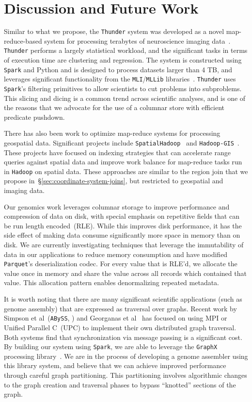 \documentclass{acm_proc_article-sp}
\begin{document}
\section{Discussion and Future Work}
\label{sec:discussion-future-work}

Similar to what we propose, the \texttt{Thunder} system was developed as a novel map-reduce-based system for
processing terabytes of neuroscience imaging data~\cite{freeman14}. \texttt{Thunder} performs a largely statistical
workload, and the significant tasks in terms of execution time are clustering and regression. The system is
constructed using \texttt{Spark} and Python and is designed to process datasets larger than 4 TB, and leverages
significant functionality from the \texttt{MLI}/\texttt{MLLib} libraries~\cite{sparks13}. \texttt{Thunder} uses \texttt{Spark}'s
filtering primitives to allow scientists to cut problems into subproblems. This slicing and dicing is a common trend across
scientific analyses, and is one of the reasons that we advocate for the use of a columnar store with efficient predicate
pushdown.

There has also been work to optimize map-reduce systems for processing geospatial data. Significant
projects include \texttt{SpatialHadoop}~\cite{eldawy15} and \texttt{Hadoop-GIS}~\cite{aji13}. These projects have
focused on indexing strategies that can accelerate range queries against spatial data and improve work balance for
map-reduce tasks run in \texttt{Hadoop} on spatial data. These approaches are similar to the region join that we
propose in~\S\ref{sec:coordinate-system-joins}, but restricted to geospatial and imaging data.

Our genomics work leverages columnar storage to improve performance and compression of data on disk,
with special emphasis on repetitive fields that can be run length encoded~(RLE). While this improves
disk performance, it has the side effect of making data consume significantly more space in memory
than on disk. We are currently investigating techniques that leverage the immutability of data in our
applications to reduce memory consumption and have modified \texttt{Parquet}'s deserialization codec. For
every value that is RLE'd, we allocate the value once in memory and share the value across all records which
contained that value. This allocation pattern enables denormalizing repeated metadata.

It is worth noting that there are many significant scientific applications (such as genome
assembly) that are expressed as traversal over graphs. Recent work by Simpson et al~(\texttt{ABySS},
\cite{simpson09}) and Georganas et al~\cite{georganas14} has focused on using MPI
or Unified Parallel C~(UPC) to implement their own distributed graph traversal. Both systems
find that synchronization via message passing is a significant cost. By building our system using \texttt{Spark}, we are
able to leverage the \texttt{GraphX} processing library~\cite{gonzalez14,
xin13}. We are in the process of developing a genome assembler using this library system, and
believe that we can achieve improved performance through careful graph partitioning. This partitioning involves
algorithmic changes to the graph creation and traversal phases to bypass ``knotted'' sections of the graph.
\end{document}
